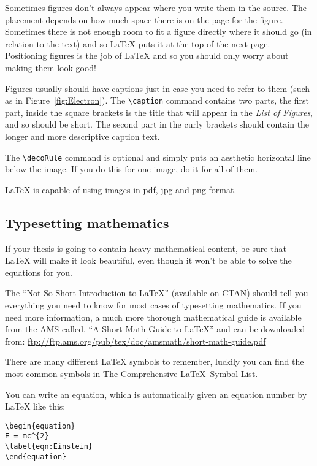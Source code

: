 Sometimes figures don't always appear where you write them in the source. The
placement depends on how much space there is on the page for the figure.
Sometimes there is not enough room to fit a figure directly where it should go
(in relation to the text) and so \LaTeX{} puts it at the top of the next page.
Positioning figures is the job of \LaTeX{} and so you should only worry about
making them look good!

Figures usually should have captions just in case you need to refer to them
(such as in Figure~\ref{fig:Electron}). The \verb|\caption| command contains
two parts, the first part, inside the square brackets is the title that will
appear in the \emph{List of Figures}, and so should be short. The second part
in the curly brackets should contain the longer and more descriptive caption
text.

The \verb|\decoRule| command is optional and simply puts an aesthetic
horizontal line below the image. If you do this for one image, do it for all of
them.

\LaTeX{} is capable of using images in pdf, jpg and png format.

\subsection{Typesetting mathematics}

If your thesis is going to contain heavy mathematical content, be sure that
\LaTeX{} will make it look beautiful, even though it won't be able to solve the
equations for you.

The \enquote{Not So Short Introduction to \LaTeX} (available on
\href{http://www.ctan.org/tex-archive/info/lshort/english/lshort.pdf}{CTAN})
should tell you everything you need to know for most cases of typesetting
mathematics. If you need more information, a much more thorough mathematical
guide is available from the AMS called, \enquote{A Short Math Guide to \LaTeX}
and can be downloaded from:
\url{ftp://ftp.ams.org/pub/tex/doc/amsmath/short-math-guide.pdf}

There are many different \LaTeX{} symbols to remember, luckily you can find the
most common symbols in \href{http://ctan.org/pkg/comprehensive}{The
    Comprehensive \LaTeX~Symbol List}.

You can write an equation, which is automatically given an equation number by
\LaTeX{} like this:
\begin{verbatim}
\begin{equation}
E = mc^{2}
\label{eqn:Einstein}
\end{equation}
\end{verbatim}

